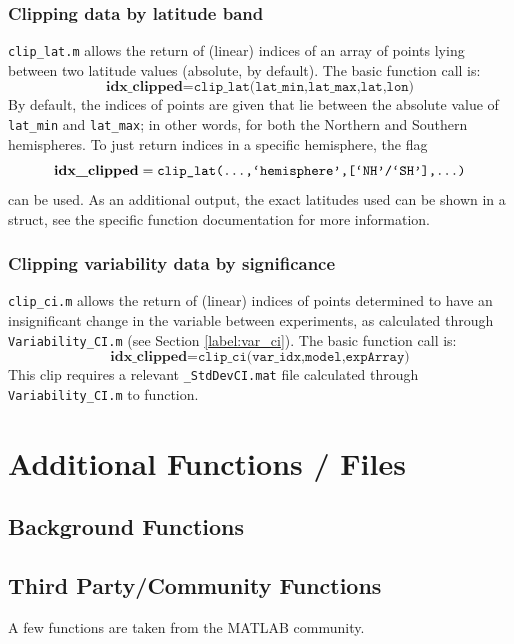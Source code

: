 \documentclass{article}
\begin{document}
\subsubsection{Clipping data by latitude band}
\texttt{clip\_lat.m} allows the return of (linear) indices of an array of points lying between two latitude values (absolute, by default). The basic function call is:
\begin{equation}
\textbf{idx\_clipped} = \texttt{clip\_lat(lat\_min,lat\_max,lat,lon)}
\end{equation}
By default, the indices of points are given that lie between the absolute value of \texttt{lat\_min} and \texttt{lat\_max}; in other words, for both the Northern and Southern hemispheres. To just return indices in a specific hemisphere, the flag 
\begin{equation}
\textbf{idx\_clipped} = \texttt{clip\_lat(\dots,`hemisphere',[`NH'/`SH'],\dots)}
\end{equation}
can be used. As an additional output, the exact latitudes used can be shown in a struct, see the specific function documentation for more information. 

\subsubsection{Clipping variability data by significance}
\texttt{clip\_ci.m} allows the return of (linear) indices of points determined to have an insignificant change in the variable between experiments, as calculated through \texttt{Variability\_CI.m} (see Section \ref{label:var_ci}). The basic function call is: 
\begin{equation}
\textbf{idx\_clipped} = \texttt{clip\_ci(var\_idx,model,expArray)}
\end{equation}
This clip requires a relevant \texttt{\_StdDevCI.mat} file calculated through \texttt{Variability\_CI.m} to function.  


\section{Additional Functions / Files} %
\subsection{Background Functions}

\subsection{Third Party/Community Functions}
A few functions are taken from the MATLAB community. 
\end{document}
